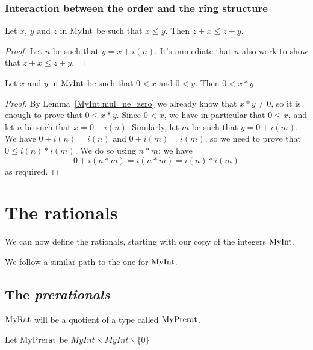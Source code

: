 \subsection{Interaction between the order and the ring structure}

\begin{lemma}
    \label{MyInt.add_le_add_left}
    \leanok
    Let $x$, $y$ and $z$ in $\mathrm{MyInt}$ be such that $x \leq y$. Then $z + x ≤ z + y$.
\end{lemma}
\begin{proof}
    \leanok
    Let $n$ be such that $y = x + i(n)$. It's immediate that $n$ also work to show that $z + x ≤ z + y$.
\end{proof}

\begin{lemma}
    \label{MyInt.mul_pos}
    \leanok
    Let $x$ and $y$ in $\mathrm{MyInt}$ be such that $0 < x$ and $0 < y$. Then $0 < x * y$.
\end{lemma}
\begin{proof}
    \leanok
    By Lemma~\ref{MyInt.mul_ne_zero} we already know that $x*y \neq 0$, so it is enough to prove that
    $0 \leq x*y$. Since $0 < x$, we have in particular that $0 \leq x$, and let $n$ be such that $x = 0 + i(n)$. Similarly, let $m$ be such that $y = 0 + i(m)$. We have $0 + i(n) = i(n)$ and $0 + i(m) = i(m)$, so we need to prove that $0 \leq i(n)*i(m)$. We do so using $n*m$: we have
    \[
    0+i(n*m)=i(n*m)=i(n)*i(m)
    \]
    as required.
\end{proof}

\chapter{The rationals}

We can now define the rationals, starting with our copy of the integers $\mathrm{MyInt}$.

We follow a similar path to the one for $\mathrm{MyInt}$.

\section{The \emph{prerationals}}

$\mathrm{MyRat}$ will be a quotient of a type called $\mathrm{MyPrerat}$.

\begin{definition}
    \label{MyPrerat}
    \leanok
    Let $\mathrm{MyPrerat}$ be $MyInt \times MyInt \backslash \{0\}$
\end{definition}

